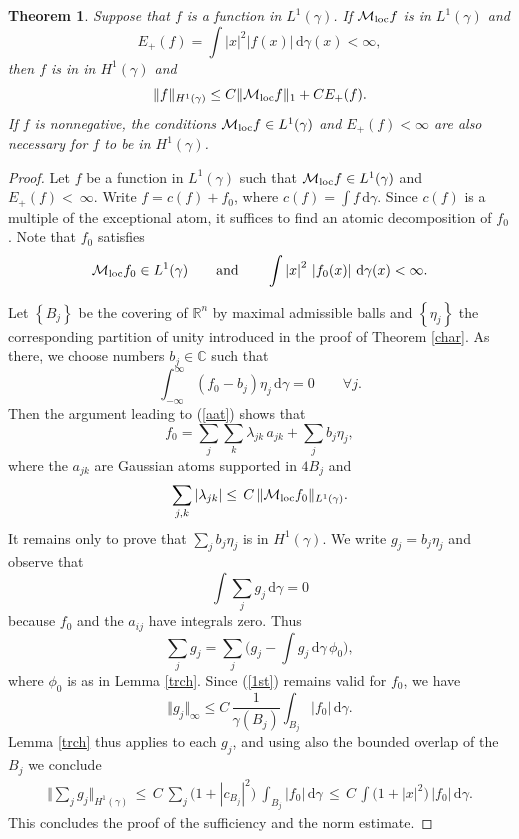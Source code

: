 \documentclass{amsart}                 %
\newtheorem{theorem}{Theorem}[section]
\numberwithin{equation}{section}
\newcommand\set[1]{{\left\{#1\right\}}}
\renewcommand\mod[1]{\left\vert{#1}\right\vert}
\newcommand\norm[2]{{\Vert{#1}\Vert_{#2}}}
\newcommand\wrt{\,\mathrm{d}}
\newcommand\1{{\bf 1}}
\newcommand\BC{\mathbb{C}}
\newcommand\BR{\mathbb{R}} \newcommand\BRd{\mathbb{R}^d}
\newcommand\cM{\mathcal{M}}  \newcommand\fM{\mathfrak{M}}
\newcommand\mlo {\cM_{\textnormal{loc}}}
\newcommand\huat[1]{H^1(#1)}
\begin{document}
\begin{theorem}\label{pos}
Suppose that $f$ is a function in $L^1(\gamma)$.
If $\mlo f$ is in $L^1(\gamma)$ and
\begin{equation}\label{nec}
E_+(f)=\int \mod{x}^2 \mod{f(x)}\wrt\gamma(x) <\infty,
\end{equation}
then $f$  is in in $\huat{\gamma}$ and 
\[
\norm{f}{\huat{\gamma}} \le C \norm{\mlo f}{1} + C E_+(f).  
\]
 If $f$ is nonnegative,  the conditions $\mlo{f}\in L^1(\gamma)$ and 
$E_+(f)<\infty$ are also necessary for $f$ to be in $\huat{\gamma}$.
\end{theorem}
\begin{proof} 
Let $f$ be a  function in $L^1(\gamma)$ such that $\mlo f\in 
L^1(\gamma)$ and  $E_+(f)<~\infty$. Write $f=c(f)+f_0$, where $c(f)=\int 
f\wrt\gamma$. Since $c(f)$ is a multiple of the exceptional atom, it 
suffices to find an atomic decomposition of $f_0$. Note that $f_0$ satisfies
$$
\mlo f_0 \in L^1(\gamma) \qquad\textrm{and}\qquad \int\mod{x}^2\, 
\mod{f_0(x)}\wrt\gamma(x)<\infty.
$$\par
Let $\set{B_j}$ be the  covering of $\BR^n$ by maximal admissible 
balls and $\set{\eta_j}$ the corresponding partition of 
unity introduced in the proof of Theorem \ref{char}.  As there, we
choose numbers $b_j\in\BC$ such that
$$
\int_{-\infty}^\infty (f_0-b_j)\eta_j \wrt \gamma =0 \qquad\forall j.
$$
Then the argument leading to (\ref{aat}) shows that
$$ f_0=\sum_j \sum_k \lambda_{jk} \,a_{jk} +\sum_j b_j \eta_j,
$$
where the $a_{jk}$ are  Gaussian atoms supported 
in $4B_j$ and 
$$
\sum_{j,k} \mod{\lambda_{jk}}\le\,C\, \norm{\mlo f_0}{L^1(\gamma)}.
$$
It remains only to prove that $\sum_j b_j \eta_j$ is in $\huat
{\gamma}$. We  write $g_j=b_j
\eta_j$ and observe that
\begin{equation}\label{intbeta}
\int \sum_j g_j\wrt\gamma=0
\end{equation}
because $f_0$ and the $a_{ij}$ have integrals zero. Thus
$$
\sum_j g_j=\sum_j\Big(g_j-\int g_j\wrt\gamma \,\phi_0\Big),
$$
where $\phi_0$ is as in Lemma \ref{trch}.
Since (\ref{1st}) remains valid for $f_0$, we have
\begin{equation}\label{n1gj}
\norm{g_j}{\infty}\le C\,\frac{1}{\gamma(B_j)} \int_{B_j}\mod{f_0}\wrt
\gamma.
\end{equation}
Lemma \ref{trch} thus applies to each $g_j$, and using also  
the bounded overlap 
of the  $B_j$ we conclude
\begin{align*}
\norm{\sum_j g_j}{H^1(\gamma)}\,\le \, C\ \sum_j\big(1+\mod{c_{B_j}}^2\big)\ \int_{B_j} \mod{f_0}\wrt\gamma 
\,\le \, C\,\int \big(1+\mod{x}^2\big)\, \mod{f_0}\wrt\gamma.
\end{align*}
This concludes the 
proof of the sufficiency and the norm estimate.
\par



\end{proof}
\end{document}
